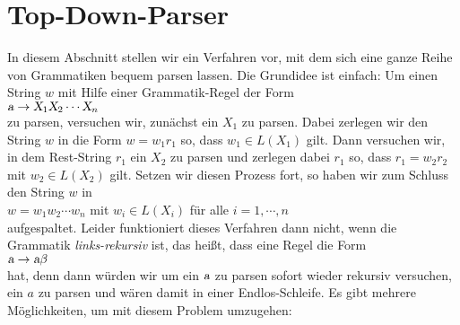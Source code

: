 \section{Top-Down-Parser}
In diesem Abschnitt stellen wir ein Verfahren vor, mit dem sich eine ganze Reihe von
Grammatiken bequem parsen lassen.  Die Grundidee ist einfach:  Um einen String $w$ mit
Hilfe einer Grammatik-Regel der Form
\\[0.2cm]
\hspace*{1.3cm}
$\textsl{a} \rightarrow \textsl{X}_1 \textsl{X}_2 \cdots \textsl{X}_n$
\\[0.2cm]
zu parsen, versuchen wir, zun\"achst ein $X_1$ zu parsen.  Dabei zerlegen wir den String $w$ in die
Form
$w = w_1 r_1$ so, dass $w_1 \in L(X_1)$ gilt.  Dann versuchen wir, in dem Rest-String
$r_1$ ein $X_2$ zu parsen und zerlegen dabei $r_1$ so, dass $r_1 = w_2 r_2$ mit 
$w_2 \in L(X_2)$ gilt.  Setzen wir diesen Prozess fort, so haben wir zum Schluss den String $w$ in
\\[0.2cm]
\hspace*{1.3cm}
$w = w_1 w_2 \cdots w_n$ \quad mit $w_i \in L(X_i)$ f\"ur alle $i=1,\cdots,n$
\\[0.2cm]
aufgespaltet.  Leider funktioniert dieses Verfahren dann nicht, wenn die Grammatik
\emph{links-rekursiv} ist, das hei{\ss}t, dass eine Regel die Form
\\[0.2cm]
\hspace*{1.3cm}
$\textsl{a} \rightarrow \textsl{a} \beta$
\\[0.2cm]
hat, denn dann w\"urden wir um ein $\textsl{a}$ zu parsen sofort wieder rekursiv versuchen, 
ein $a$ zu parsen und w\"aren damit in einer Endlos-Schleife.  Es gibt mehrere M\"oglichkeiten, um mit
diesem Problem umzugehen:
